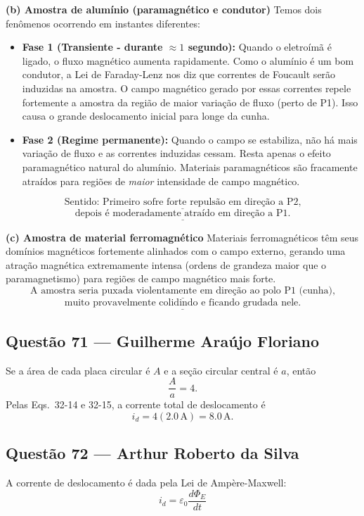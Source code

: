 \documentclass[12pt,a4paper]{article}
\begin{document}
\vspace{0.2cm}
\textbf{(b) Amostra de alumínio (paramagnético e condutor)}
Temos dois fenômenos ocorrendo em instantes diferentes:
\begin{itemize}
    \item \textbf{Fase 1 (Transiente - durante $\approx 1$ segundo):} Quando o eletroímã é ligado, o fluxo magnético aumenta rapidamente. Como o alumínio é um bom condutor, a Lei de Faraday-Lenz nos diz que correntes de Foucault serão induzidas na amostra. O campo magnético gerado por essas correntes repele fortemente a amostra da região de maior variação de fluxo (perto de P1). Isso causa o grande deslocamento inicial para longe da cunha.
    \item \textbf{Fase 2 (Regime permanente):} Quando o campo se estabiliza, não há mais variação de fluxo e as correntes induzidas cessam. Resta apenas o efeito paramagnético natural do alumínio. Materiais paramagnéticos são fracamente atraídos para regiões de \textit{maior} intensidade de campo magnético.
\end{itemize}
\[\underline{\text{Sentido: Primeiro sofre forte repulsão em direção a P2,}}\]
\[\underline{\text{depois é moderadamente atraído em direção a P1.}}\]

\vspace{0.2cm}
\textbf{(c) Amostra de material ferromagnético}
Materiais ferromagnéticos têm seus domínios magnéticos fortemente alinhados com o campo externo, gerando uma atração magnética extremamente intensa (ordens de grandeza maior que o paramagnetismo) para regiões de campo magnético mais forte.
\[\underline{\text{A amostra seria puxada violentamente em direção ao polo P1 (cunha),}}\]
\[\underline{\text{muito provavelmente colidindo e ficando grudada nele.}}\]
 

\subsection{Questão 71 — Guilherme Araújo Floriano}

Se a área de cada placa circular é $A$ e a seção circular central é $a$, então
\[
\frac{A}{a}=4.
\]
Pelas Eqs.~32-14 e 32-15, a corrente total de deslocamento é
\[
i_d=4(2.0\,\mathrm{A})=8.0\,\mathrm{A}.
\]


\subsection{Questão 72 — Arthur Roberto da Silva}
A corrente de deslocamento é dada pela Lei de Ampère-Maxwell:
\begin{equation*}
i_d = \varepsilon_0 \frac{d\Phi_E}{dt}
\end{equation*}
\end{document}
